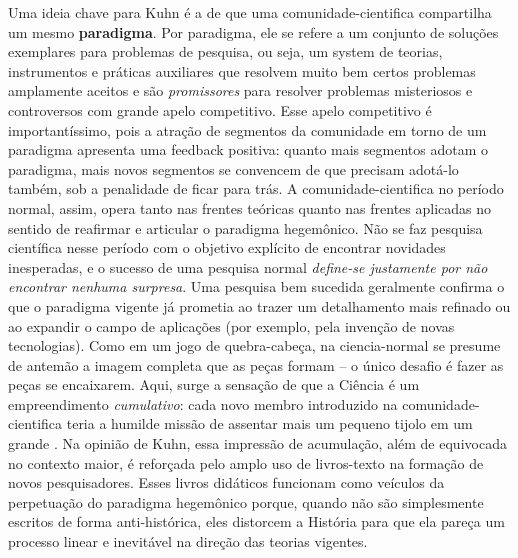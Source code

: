 \documentclass[./main.tex]{subfiles}
\begin{document}
\par Uma ideia chave para Kuhn é a de que uma \gls{comunidade-cientifica} compartilha um mesmo \textbf{\gls{paradigma}}. Por \gls{paradigma}, ele se refere a um conjunto de soluções exemplares para problemas de pesquisa, ou seja, um \gls{system} de teorias, instrumentos e práticas auxiliares que resolvem muito bem certos problemas amplamente aceitos e são \textit{promissores} para resolver problemas misteriosos e controversos com grande apelo competitivo. Esse apelo competitivo é importantíssimo, pois a atração de segmentos da comunidade em torno de um \gls{paradigma} apresenta uma \gls{feedback} positiva: quanto mais segmentos adotam o \gls{paradigma}, mais novos segmentos se convencem de que precisam adotá-lo também, sob a penalidade de ficar para trás. A \gls{comunidade-cientifica} no período normal, assim, opera tanto nas frentes teóricas quanto nas frentes aplicadas no sentido de reafirmar e articular o \gls{paradigma} hegemônico. Não se faz pesquisa científica nesse período com o objetivo explícito de encontrar novidades inesperadas, e o sucesso de uma pesquisa normal \textit{define-se justamente por não encontrar nenhuma surpresa}. Uma pesquisa bem sucedida geralmente confirma o que o \gls{paradigma} vigente já prometia ao trazer um detalhamento mais refinado ou ao expandir o campo de aplicações (por exemplo, pela invenção de novas tecnologias). Como em um jogo de quebra-cabeça, na \gls{ciencia-normal} se presume de antemão a imagem completa que as peças formam – o único desafio é fazer as peças se encaixarem. Aqui, surge a sensação de que a Ciência é um empreendimento \textit{cumulativo}: cada novo membro introduzido na \gls{comunidade-cientifica} teria a humilde missão de assentar mais um pequeno tijolo em um grande . Na opinião de Kuhn, essa impressão de acumulação, além de equivocada no contexto maior, é reforçada pelo amplo uso de livros-texto na formação de novos pesquisadores. Esses livros didáticos funcionam como veículos da perpetuação do \gls{paradigma} hegemônico porque, quando não são simplesmente escritos de forma anti-histórica, eles distorcem a História para que ela pareça um processo linear e inevitável na direção das teorias vigentes.
\end{document}
